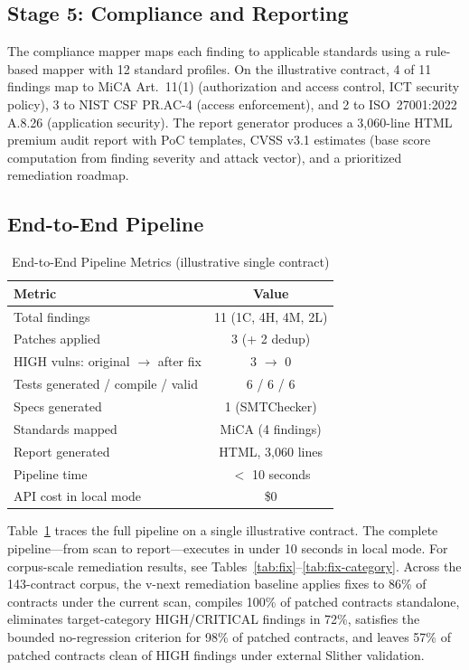 \documentclass[conference]{IEEEtran}
\begin{document}
\subsection{Stage 5: Compliance and Reporting}

The compliance mapper maps each finding to applicable standards using a rule-based mapper with 12 standard profiles. On the illustrative contract, 4 of 11 findings map to MiCA Art.~11(1) (authorization and access control, ICT security policy), 3 to NIST CSF PR.AC-4 (access enforcement), and 2 to ISO~27001:2022 A.8.26 (application security). The report generator produces a 3{,}060-line HTML premium audit report with PoC templates, CVSS v3.1 estimates (base score computation from finding severity and attack vector), and a prioritized remediation roadmap.

\subsection{End-to-End Pipeline}

\begin{table}[htbp]
\caption{End-to-End Pipeline Metrics (illustrative single contract)}
\label{tab:e2e}
\centering
\begin{tabular}{@{}lc@{}}
\toprule
\textbf{Metric} & \textbf{Value} \\
\midrule
Total findings & 11 (1C, 4H, 4M, 2L) \\
Patches applied & 3 (+ 2 dedup) \\
HIGH vulns: original $\rightarrow$ after fix & 3 $\rightarrow$ 0 \\
Tests generated / compile / valid & 6 / 6 / 6 \\
Specs generated & 1 (SMTChecker) \\
Standards mapped & MiCA (4 findings) \\
Report generated & HTML, 3{,}060 lines \\
Pipeline time & $<$ 10 seconds \\
API cost in local mode & \$0 \\
\bottomrule
\end{tabular}
\end{table}

Table~\ref{tab:e2e} traces the full pipeline on a single illustrative contract. The complete pipeline---from scan to report---executes in under 10 seconds in local mode. For corpus-scale remediation results, see Tables~\ref{tab:fix}--\ref{tab:fix-category}. Across the 143-contract corpus, the v-next remediation baseline applies fixes to 86\% of contracts under the current scan, compiles 100\% of patched contracts standalone, eliminates target-category HIGH/CRITICAL findings in 72\%, satisfies the bounded no-regression criterion for 98\% of patched contracts, and leaves 57\% of patched contracts clean of HIGH findings under external Slither validation.
\end{document}
